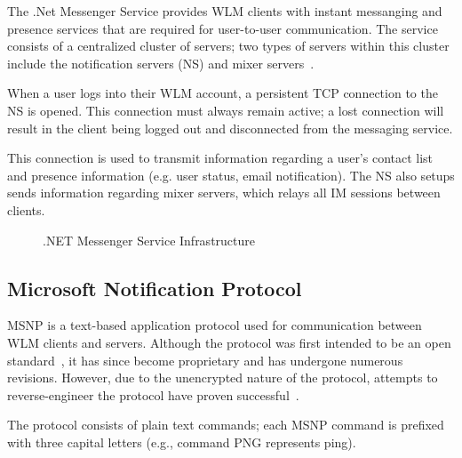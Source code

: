 \documentclass{sig-alternate}
\begin{document}
The .Net Messenger Service provides WLM clients with instant messanging and presence services that are required for user-to-user communication.
The service consists of a centralized cluster of servers; two types of servers within this cluster include the notification servers (NS) and mixer servers~\cite{torre:wlm}.

When a user logs into their WLM account, a persistent TCP connection to the NS is opened.
This connection must always remain active; a lost connection will result in the client being logged out and disconnected from the messaging service.

This connection is used to transmit information regarding a user's contact list and presence information (e.g.
user status, email notification).
The NS also setups sends information regarding mixer servers, which relays all IM sessions between clients.


\begin{figure}[h]
	\centering
	\caption{.NET Messenger Service Infrastructure}
	\label{fig:wlminfrastructure}
\end{figure}

\subsection{Microsoft Notification Protocol}

MSNP is a text-based application protocol used for communication between WLM clients and servers.
Although the protocol was first intended to be an open standard~\cite{fout:insidewlm}, it has since become proprietary and has undergone numerous revisions.
However, due to the unencrypted nature of the protocol, attempts to reverse-engineer the protocol have proven successful~\cite{hypothetic:msnp, msnfanatic:msnp}.

The protocol consists of plain text commands; each MSNP command is prefixed with three capital letters (e.g., command PNG represents ping).
\end{document}
